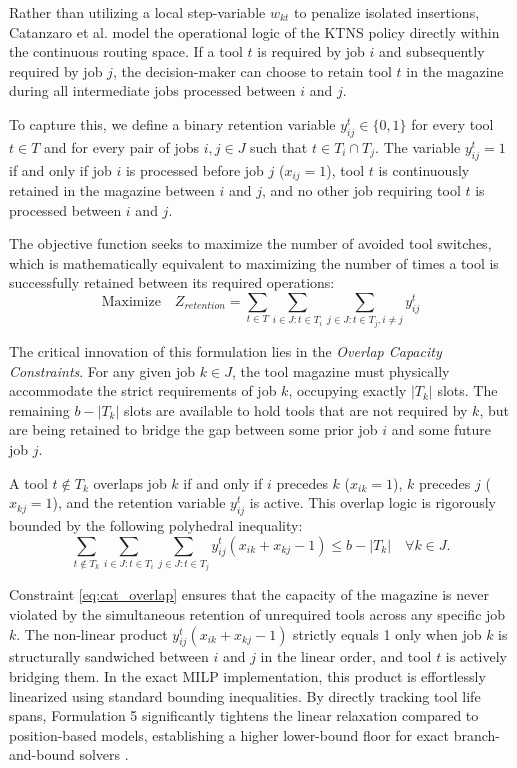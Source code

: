\documentclass[11pt, a4paper]{book}
\begin{document}
	Rather than utilizing a local step-variable $w_{kt}$ to penalize isolated insertions, Catanzaro et al. model the operational logic of the KTNS policy directly within the continuous routing space. If a tool $t$ is required by job $i$ and subsequently required by job $j$, the decision-maker can choose to retain tool $t$ in the magazine during all intermediate jobs processed between $i$ and $j$. 
	
	To capture this, we define a binary retention variable $y_{ij}^t \in \{0,1\}$ for every tool $t \in T$ and for every pair of jobs $i, j \in J$ such that $t \in T_i \cap T_j$. The variable $y_{ij}^t = 1$ if and only if job $i$ is processed before job $j$ ($x_{ij} = 1$), tool $t$ is continuously retained in the magazine between $i$ and $j$, and no other job requiring tool $t$ is processed between $i$ and $j$.
	
	The objective function seeks to maximize the number of avoided tool switches, which is mathematically equivalent to maximizing the number of times a tool is successfully retained between its required operations:
	\begin{equation}
		\text{Maximize} \quad Z_{retention} = \sum_{t \in T} \sum_{i \in J : t \in T_i} \sum_{j \in J : t \in T_j, i \neq j} y_{ij}^t \label{eq:cat_obj}
	\end{equation}
	
	The critical innovation of this formulation lies in the \textit{Overlap Capacity Constraints}. For any given job $k \in J$, the tool magazine must physically accommodate the strict requirements of job $k$, occupying exactly $|T_k|$ slots. The remaining $b - |T_k|$ slots are available to hold tools that are not required by $k$, but are being retained to bridge the gap between some prior job $i$ and some future job $j$. 
	
	A tool $t \notin T_k$ overlaps job $k$ if and only if $i$ precedes $k$ ($x_{ik} = 1$), $k$ precedes $j$ ($x_{kj} = 1$), and the retention variable $y_{ij}^t$ is active. This overlap logic is rigorously bounded by the following polyhedral inequality:
	\begin{equation}
		\sum_{t \notin T_k} \sum_{i \in J : t \in T_i} \sum_{j \in J : t \in T_j} y_{ij}^t (x_{ik} + x_{kj} - 1) \le b - |T_k| \quad \forall k \in J. \label{eq:cat_overlap}
	\end{equation}
	
	Constraint \eqref{eq:cat_overlap} ensures that the capacity of the magazine is never violated by the simultaneous retention of unrequired tools across any specific job $k$. The non-linear product $y_{ij}^t (x_{ik} + x_{kj} - 1)$ strictly equals 1 only when job $k$ is structurally sandwiched between $i$ and $j$ in the linear order, and tool $t$ is actively bridging them. In the exact MILP implementation, this product is effortlessly linearized using standard bounding inequalities. By directly tracking tool life spans, Formulation 5 significantly tightens the linear relaxation compared to position-based models, establishing a higher lower-bound floor for exact branch-and-bound solvers \cite{Catanzaro2015}.
	
\end{document}
